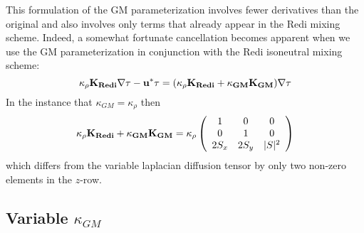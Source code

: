 This formulation of the GM parameterization involves fewer derivatives
than the original and also involves only terms that already appear in
the Redi mixing scheme. Indeed, a somewhat fortunate cancellation
becomes apparent when we use the GM parameterization in conjunction
with the Redi isoneutral mixing scheme:
\begin{equation}
\kappa_\rho \bf{K}_{Redi} \bf{\nabla} \tau
- u^* \tau = 
( \kappa_\rho \bf{K}_{Redi} + \kappa_{GM} \bf{K}_{GM} ) \bf{\nabla} \tau
\end{equation}
In the instance that $\kappa_{GM} = \kappa_{\rho}$ then
\begin{equation}
\kappa_\rho \bf{K}_{Redi} + \kappa_{GM} \bf{K}_{GM} =
\kappa_\rho
\left( \begin{array}{ccc}
1 & 0 & 0 \\
0 & 1 & 0 \\
2 S_x & 2 S_y & |S|^2 
\end{array}
\right)
\end{equation}
which differs from the variable laplacian diffusion tensor by only
two non-zero elements in the $z$-row.




\subsection{Variable $\kappa_{GM}$}

